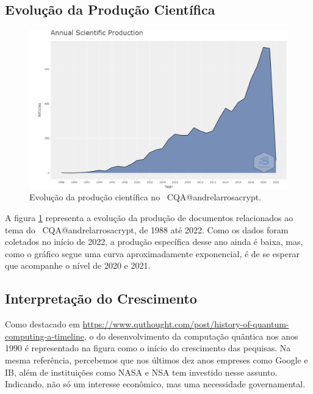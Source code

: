 \subsection{Evolução da Produção Científica}

\begin{figure}
    \centering
    \includegraphics[width=1\textwidth]{experiments/andrelarrosacrypt/AnaliseBibliometrica/CriptografiaQuantica/imagens/CQA@andrelarrosacrypt_ProdAnual.png}
    \caption{Evolução da produção científica no \dataset\ CQA@andrelarrosacrypt.}
    \label{CQA@andrelarrosacrypt_ProdAnual}
\end{figure}

A figura \ref{CQA@andrelarrosacrypt_ProdAnual} representa a evolução da produção de documentos relacionados ao tema do \dataset\ CQA@andrelarrosacrypt, de 1988 até 2022. Como os dados foram coletados no início de 2022, a produção específica desse ano ainda é baixa, mas, como o gráfico segue uma curva aproximadamente exponencial, é de se esperar que acompanhe o nível de 2020 e 2021.



\subsection{Interpretação do Crescimento}

Como destacado em \url{https://www.quthought.com/post/history-of-quantum-computing-a-timeline}, o do desenvolvimento da computação quântica nos anos 1990 é representado na figura como o início do crescimento das pequisas. Na mesma referência, percebemos que nos últimos dez anos empreses como Google e IB, além de instituições como NASA e NSA tem investido nesse assunto. Indicando, não só um interesse econômico, mas uma necessidade governamental.

